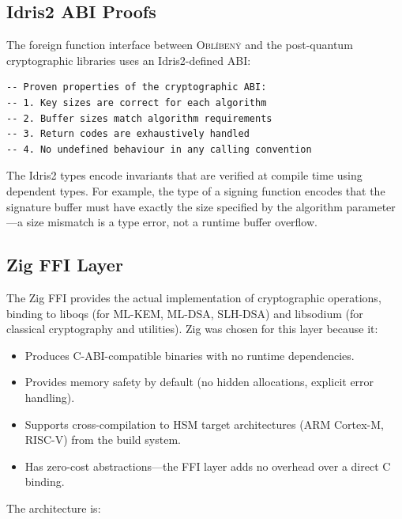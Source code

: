 \documentclass[11pt,a4paper]{article}
\newcommand{\obl}{\textsc{Obl\'{i}ben\'{y}}}
\begin{document}
\subsection{Idris2 ABI Proofs}

The foreign function interface between \obl{} and the post-quantum
cryptographic libraries uses an Idris2-defined ABI:

\begin{lstlisting}[language={},caption={Idris2 ABI definition (excerpt from Crypto.idr)}]
-- Proven properties of the cryptographic ABI:
-- 1. Key sizes are correct for each algorithm
-- 2. Buffer sizes match algorithm requirements
-- 3. Return codes are exhaustively handled
-- 4. No undefined behaviour in any calling convention
\end{lstlisting}

The Idris2 types encode invariants that are verified at compile time using
dependent types.  For example, the type of a signing function encodes that the
signature buffer must have exactly the size specified by the algorithm
parameter---a size mismatch is a type error, not a runtime buffer overflow.

\subsection{Zig FFI Layer}

The Zig FFI provides the actual implementation of cryptographic operations,
binding to liboqs (for ML-KEM, ML-DSA, SLH-DSA) and libsodium (for classical
cryptography and utilities).  Zig was chosen for this layer because it:

\begin{itemize}[nosep]
  \item Produces C-ABI-compatible binaries with no runtime dependencies.
  \item Provides memory safety by default (no hidden allocations, explicit
    error handling).
  \item Supports cross-compilation to HSM target architectures (ARM
    Cortex-M, RISC-V) from the build system.
  \item Has zero-cost abstractions---the FFI layer adds no overhead over a
    direct C binding.
\end{itemize}

The architecture is:
\end{document}
